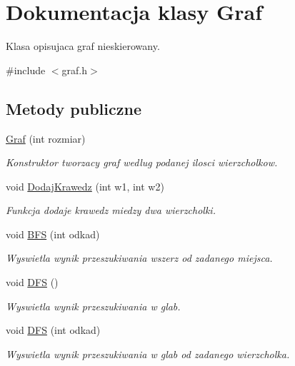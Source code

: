 \hypertarget{class_graf}{\section{Dokumentacja klasy Graf}
\label{class_graf}
}


Klasa opisujaca graf nieskierowany.  




{\ttfamily \#include $<$graf.\-h$>$}

\subsection*{Metody publiczne}
\begin{DoxyCompactItemize}
\item 
\hyperlink{class_graf_a56767176b30fa6759e1b664bfa815423}{Graf} (int rozmiar)
\begin{DoxyCompactList}\small\item\em Konstruktor tworzacy graf wedlug podanej ilosci wierzcholkow. \end{DoxyCompactList}\item 
void \hyperlink{class_graf_abbf515053e5cd08a7b95c24dfbd1370d}{Dodaj\-Krawedz} (int w1, int w2)
\begin{DoxyCompactList}\small\item\em Funkcja dodaje krawedz miedzy dwa wierzcholki. \end{DoxyCompactList}\item 
void \hyperlink{class_graf_ad857a2246916d911b6616497c169e47c}{B\-F\-S} (int odkad)
\begin{DoxyCompactList}\small\item\em Wyswietla wynik przeszukiwania wszerz od zadanego miejsca. \end{DoxyCompactList}\item 
void \hyperlink{class_graf_a8b40e6700dd8f1f71b6b47558c0975a1}{D\-F\-S} ()
\begin{DoxyCompactList}\small\item\em Wyswietla wynik przeszukiwania w glab. \end{DoxyCompactList}\item 
void \hyperlink{class_graf_ab604c6d56e372a70b85368f03cc9508b}{D\-F\-S} (int odkad)
\begin{DoxyCompactList}\small\item\em Wyswietla wynik przeszukiwania w glab od zadanego wierzcholka. \end{DoxyCompactList}\end{DoxyCompactItemize}


